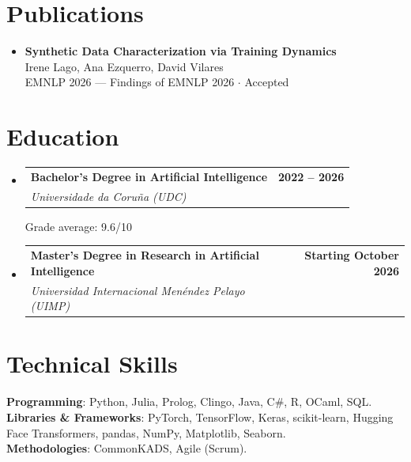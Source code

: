 \documentclass[letterpaper,11pt]{article}
\makeatletter
\newcommand{\resumeSubheading}[4]{
  \item
    \begin{tabular*}{0.97\textwidth}[t]{@{}p{0.72\textwidth}@{\extracolsep{\fill}}r@{}}
      \textbf{#1} & \textbf{\small #2} \\
      \textit{\small #3} & \textit{\small #4} \\
    \end{tabular*}
  \vspace{2pt}
}
\newcommand{\resumeSubHeadingListStart}{\begin{itemize}[leftmargin=0.12in, label={}, itemsep=6pt, parsep=0pt, topsep=2pt]}
\newcommand{\resumeSubHeadingListEnd}{\end{itemize}}
\makeatother
\begin{document}
\section{Publications}
\resumeSubHeadingListStart
  \item
    \textbf{Synthetic Data Characterization via Training Dynamics}\\[2pt]
    {\small Irene Lago, Ana Ezquerro, David Vilares}\\[1pt]
    {\small EMNLP 2026 --- Findings of EMNLP 2026 $\cdot$ Accepted}
\resumeSubHeadingListEnd

\section{Education}
\resumeSubHeadingListStart
  \resumeSubheading
    {Bachelor's Degree in Artificial Intelligence}{2022 -- 2026}
    {Universidade da Coru\~{n}a (UDC)}{}
  \vspace{-2pt}
  {\small Grade average: 9.6/10}
  \vspace{2pt}
  \resumeSubheading
    {Master's Degree in Research in Artificial Intelligence}{Starting October 2026}
    {Universidad Internacional Men\'{e}ndez Pelayo (UIMP)}{}
\resumeSubHeadingListEnd

\section{Technical Skills}
\begin{itemize}[leftmargin=0.12in, label={}, itemsep=2pt, topsep=2pt]
  \small{\item{
    \textbf{Programming}{:} Python, Julia, Prolog, Clingo, Java, C\#, R, OCaml, SQL. \\
    \textbf{Libraries \& Frameworks}{:} PyTorch, TensorFlow, Keras, scikit-learn, Hugging Face Transformers, pandas, NumPy, Matplotlib, Seaborn. \\
    \textbf{Methodologies}{:} CommonKADS, Agile (Scrum).
  }}
\end{itemize}

\end{document}
